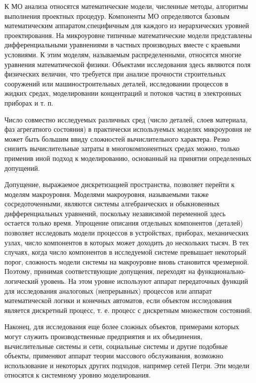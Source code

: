 \documentclass[unicode, 12pt, a4paper, oneside]{article}
\begin{document}
К МО анализа относятся математические модели, численные методы, алгоритмы выполнения проектных процедур. Компоненты МО определяются базовым математическим аппаратом,специфичным для каждого из иерархических уровней проектирования. На микроуровне типичные математические модели представлены дифференциальными уравнениями в частных производных вместе с краевыми условиями. К этим моделям, называемым распределенными, относятся многие уравнения математической физики. Объектами исследования здесь являются поля физических величин, что требуется при анализе прочности строительных сооружений или машиностроительных деталей, исследовании процессов в жидких средах, моделировании концентраций и потоков частиц в электронных приборах и т. п.

Число совместно исследуемых различных сред (число деталей, слоев материала, фаз агрегатного состояния) в практически используемых моделях микроуровня не может быть большим ввиду сложностей вычислительного характера. Резко снизить вычислительные затраты в многокомпонентных средах можно, только применив иной подход к моделированию, основанный на принятии определенных допущений.

Допущение, выражаемое дискретизацией пространства, позволяет перейти к моделям макроуровня. Моделями макроуровня, называемыми также сосредоточенными, являются системы алгебраических и обыкновенных дифференциальных уравнений, поскольку независимой переменной здесь остается только время. Упрощение описания отдельных компонентов (деталей) позволяет исследовать модели процессов в устройствах, приборах, механических узлах, число компонентов в которых может доходить до нескольких тысяч. В тех случаях, когда число компонентов в исследуемой системе превышает некоторый порог, сложность модели системы на макроуровне вновь становится чрезмерной. Поэтому, принимая соответствующие допущения, переходят на функционально-логический уровень. На этом уровне используют аппарат передаточных функций для исследования аналоговых (непрерывных) процессов или аппарат математической логики и конечных автоматов, если объектом исследования является дискретный процесс, т. е. процесс с дискретным множеством состояний.

Наконец, для исследования еще более сложных объектов, примерами которых могут служить производственные предприятия и их объединения, вычислительные системы и сети, социальные системы и другие подобные объекты, применяют аппарат теории массового обслуживания, возможно использование и некоторых других подходов, например сетей Петри. Эти модели относятся к
системному уровню моделирования.
\end{document}
